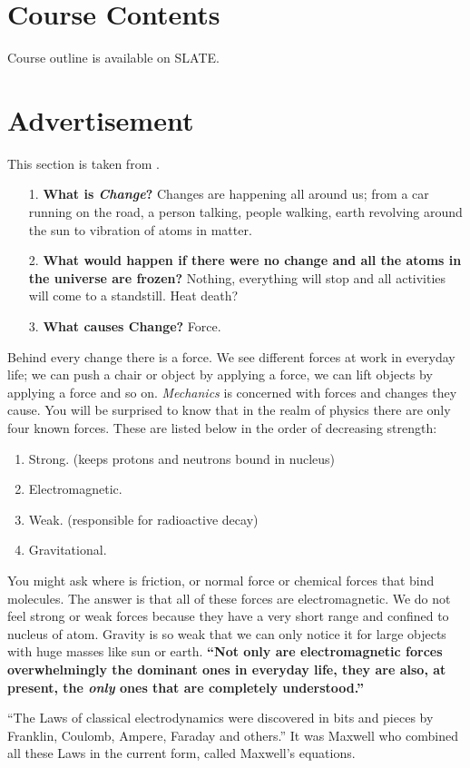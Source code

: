 \documentclass[12pt,a4paper]{article}
\begin{document}
\section{Course Contents}
Course outline is available on SLATE.
\section{Advertisement}
This section is taken from \cite{Griffith}.
\begin{itemize}
	\item[1.] \textbf{What is \textit{Change}?} Changes are happening all around us; from a car running on the road, a person talking, people walking, earth revolving around the sun to vibration of atoms in matter.
	\item[2.] \textbf{What would happen if there were no change and all the atoms in the universe are frozen?} Nothing, everything will stop and all activities will come to a standstill. Heat death?
	\item[3.] \textbf{What causes Change?} Force.
\end{itemize}
Behind every change there is a force. We see different forces at work in everyday life; we can push a chair or object by applying a force, we can lift objects by applying a force and so on. \textit{Mechanics} is concerned with forces and changes they cause. You will be surprised to know that in the realm of physics there are only four known forces. These are listed below in the order of decreasing strength:
\begin{enumerate}
\item Strong. (keeps protons and neutrons bound in nucleus)
\item Electromagnetic.
\item Weak. (responsible for radioactive decay)
\item Gravitational.
\end{enumerate}
You might ask where is friction, or normal force or chemical forces that bind molecules. The answer is that all of these forces are electromagnetic. We do not feel strong or weak forces because they have a very short range and confined to nucleus of atom. Gravity is so weak that we can only notice it for large objects with huge masses like sun or earth. \textbf{``Not only are electromagnetic forces overwhelmingly the dominant ones in everyday life, they are also, at present, the \textit{only} ones that are completely understood.''}\cite[page 14]{Griffith}

``The Laws of classical electrodynamics were discovered in bits and pieces by Franklin, Coulomb, Ampere, Faraday and others.'' It was Maxwell who combined all these Laws in the current form, called Maxwell's equations.
\end{document}
